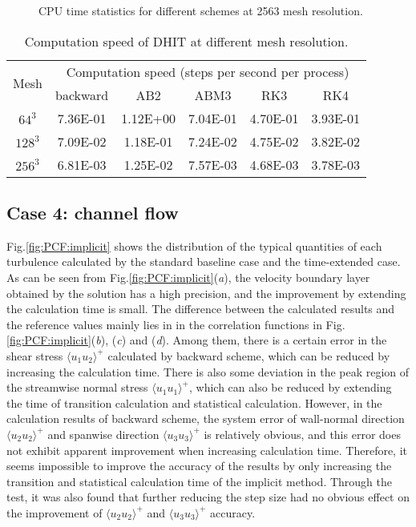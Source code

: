 \documentclass{article}
\begin{document}
\begin{figure}
	\centering
	\caption{CPU time statistics for different schemes at 2563 mesh resolution.}
	\label{fig:DHIT:speed}
\end{figure}

\begin{table}
  \caption{Computation speed of DHIT at different mesh resolution.}
  \centering
  \begin{tabular}{cccccc}
    \toprule
    \multirow{2}{*}{Mesh} & \multicolumn{5}{c}{Computation speed (steps per second per process)}            \\
    \cmidrule{2-6}
                               & backward    & AB2         & ABM3        & RK3         & RK4         \\
    \midrule
    $64^3$                   & 7.36E-01     & 1.12E+00    & 7.04E-01    & 4.70E-01    & 3.93E-01    \\
    $128^3$                  & 7.09E-02     & 1.18E-01    & 7.24E-02    & 4.75E-02    & 3.82E-02    \\
    $256^3$                  & 6.81E-03     & 1.25E-02    & 7.57E-03    & 4.68E-03    & 3.78E-03    \\
    \bottomrule
    \end{tabular}
  \label{tab:DHIT:speed}
\end{table}


\subsection{Case 4: channel flow}

Fig.\ref{fig:PCF:implicit} shows the distribution of the typical quantities of each turbulence calculated by the standard baseline case and the time-extended case. As can be seen from Fig.\ref{fig:PCF:implicit}(\textit{a}), the velocity boundary layer obtained by the solution has a high precision, and the improvement by extending the calculation time is small. The difference between the calculated results and the reference values mainly lies in in the correlation functions in Fig.\ref{fig:PCF:implicit}(\textit{b}), (\textit{c}) and (\textit{d}). Among them, there is a certain error in the shear stress $\langle u_{1}u_{2} \rangle^+$ calculated by backward scheme, which can be reduced by increasing the calculation time. There is also some deviation in the peak region of the streamwise normal stress $\langle u_{1}u_{1} \rangle^+$, which can also be reduced by extending the time of transition calculation and statistical calculation. However, in the calculation results of backward scheme, the system error of wall-normal direction $\langle u_{2}u_{2} \rangle^+$ and spanwise direction $\langle u_{3}u_{3} \rangle^+$ is relatively obvious, and this error does not exhibit apparent improvement when increasing calculation time. Therefore, it seems impossible to improve the accuracy of the results by only increasing the transition and statistical calculation time of the implicit method. Through the test, it was also found that further reducing the step size had no obvious effect on the improvement of $\langle u_{2}u_{2} \rangle^+$ and $\langle u_{3}u_{3} \rangle^+$ accuracy.
\end{document}
